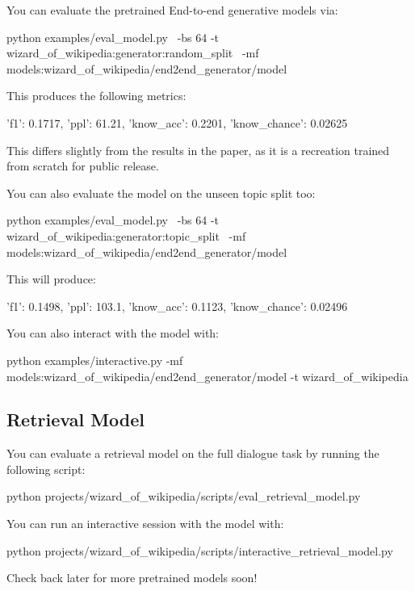 You can evaluate the pretrained End-\/to-\/end generative models via\+: \begin{DoxyVerb}python examples/eval_model.py \
    -bs 64 -t wizard_of_wikipedia:generator:random_split \
    -mf models:wizard_of_wikipedia/end2end_generator/model
\end{DoxyVerb}


This produces the following metrics\+: \begin{DoxyVerb}{'f1': 0.1717, 'ppl': 61.21, 'know_acc': 0.2201, 'know_chance': 0.02625}
\end{DoxyVerb}


This differs slightly from the results in the paper, as it is a recreation trained from scratch for public release.

You can also evaluate the model on the unseen topic split too\+: \begin{DoxyVerb}python examples/eval_model.py \
    -bs 64 -t wizard_of_wikipedia:generator:topic_split \
    -mf models:wizard_of_wikipedia/end2end_generator/model
\end{DoxyVerb}


This will produce\+: \begin{DoxyVerb}{'f1': 0.1498, 'ppl': 103.1, 'know_acc': 0.1123, 'know_chance': 0.02496}
\end{DoxyVerb}


You can also interact with the model with\+: \begin{DoxyVerb}python examples/interactive.py -mf models:wizard_of_wikipedia/end2end_generator/model -t wizard_of_wikipedia
\end{DoxyVerb}


\subsection*{Retrieval Model}

You can evaluate a retrieval model on the full dialogue task by running the following script\+: \begin{DoxyVerb}python projects/wizard_of_wikipedia/scripts/eval_retrieval_model.py
\end{DoxyVerb}


You can run an interactive session with the model with\+: \begin{DoxyVerb}python projects/wizard_of_wikipedia/scripts/interactive_retrieval_model.py
\end{DoxyVerb}


Check back later for more pretrained models soon!

